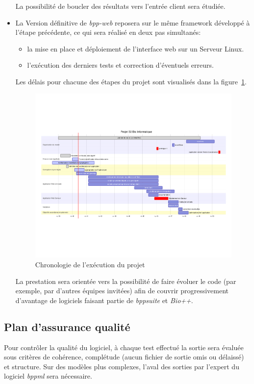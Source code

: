 \begin{itemize}
	La possibilité de boucler des résultats vers l'entrée client sera étudiée.
	 
	\item La Version définitive de \textit{bpp-web} reposera sur le même framework développé
	à l'étape précédente, ce qui sera réalisé en deux pas simultanés:
	\begin{itemize}
		\item la mise en place et déploiement de l'interface web sur un Serveur Linux.
		\item l'exécution des derniers tests et correction d'éventuels erreurs.
	\end{itemize}
	
	Les délais pour chacune des étapes du projet sont visualisés dans la figure~\ref{planning}.
	\begin{figure}[ht!]
		\caption{\label{planning} Chronologie de l'exécution du projet}
		\includegraphics[trim={1.5cm 8cm 2cm 8cm},clip,width=\textwidth]{fig/mermaid1.pdf}
	\end{figure}
	
	La prestation sera orientée vers la possibilité de faire évoluer le code (par exemple, par d'autres équipes invitées) 
	afin de couvrir progressivement d'avantage de logiciels faisant partie de \textit{bppsuite} et \textit{Bio++}.
\end{itemize}


\subsection{Plan d'assurance qualité}
 Pour contrôler la qualité du logiciel, à chaque test effectué la sortie sera  
 évaluée sous critères de cohérence, complétude (aucun fichier de sortie omis ou délaissé)
 et structure. Sur des modèles plus complexes, l'aval des sorties par l'expert du logiciel \textit{bppml} sera nécessaire.

